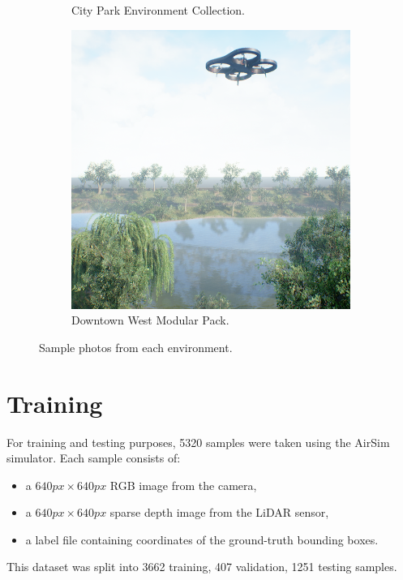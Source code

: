 \documentclass[twoside]{ctuthesis}
\theoremstyle{plain}
\theoremstyle{definition}
\theoremstyle{note}
\begin{document}
\begin{figure}
\begin{subfigure}[b]{0.3\textwidth}
		\caption{City Park Environment Collection.}
	\end{subfigure}
	\hfill
	\begin{subfigure}[b]{0.3\textwidth}
		\centering
		\includegraphics[width=\textwidth]{park_rgb.png}
		\caption{Downtown West Modular Pack.}
	\end{subfigure}
	\caption{Sample photos from each environment.}
	\label{fig:ue_env}
\end{figure}
\section{Training}
For training and testing purposes, 5320 samples were taken using the AirSim simulator. Each sample consists of:
\begin{itemize}
	\item a $640px \times 640px$ RGB image from the camera,
	\item a $640px \times 640px$ sparse depth image from the LiDAR sensor,
	\item a label file containing coordinates of the ground-truth bounding boxes.
\end{itemize}
This dataset was split into 3662 training, 407 validation, 1251 testing samples.
\end{document}
